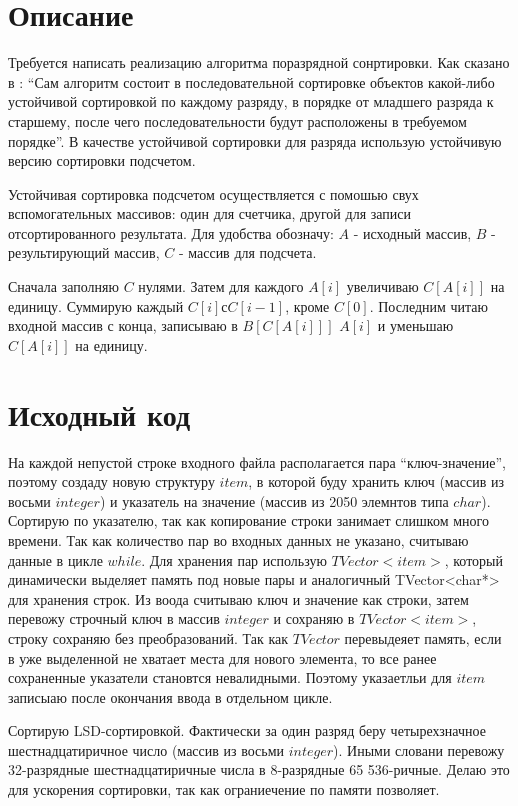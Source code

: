 \section{Описание}
Требуется написать реализацию алгоритма поразрядной сонртировки. 
Как сказано в \cite{Kormen}: \enquote{Сам алгоритм состоит в последовательной сортировке объектов какой-либо устойчивой сортировкой по каждому разряду, в порядке от младшего разряда к старшему, после чего последовательности будут расположены в требуемом порядке}. В качестве устойчивой сортировки для разряда использую устойчивую версию сортировки подсчетом\cite{wikipedia_sort}. 

Устойчивая сортировка подсчетом осуществляется с помошью свух вспомогательных массивов: один для счетчика, другой для записи отсортированного результата. Для удобства обозначу: $A$ - исходный массив, $B$ - результирующий массив, $C$ - массив для подсчета. 

Сначала заполняю $C$ нулями. Затем для каждого $A[i]$ увеличиваю $C[A[i]]$ на единицу. Суммирую каждый $C[i] с C[i - 1]$, кроме $C[0]$. Последним читаю входной массив с конца, записываю в $B[C[A[i]]]$ $A[i]$ и уменьшаю $C[A[i]]$ на единицу\cite{wikipedia_sort}.

\pagebreak

\section{Исходный код}
На каждой непустой строке входного файла располагается пара \enquote{ключ-значение}, поэтому создаду новую 
структуру $item$, в которой буду хранить ключ (массив из восьми $integer$) и указатель на значение (массив из 2050 элемнтов типа $char$).  Сортирую по указателю, так как копирование строки занимает слишком много времени. Так как количество пар во входных данных не указано, считываю данные в цикле $while$. Для хранения пар использую $TVector<item>$, который динамически выделяет память под новые пары и аналогичный TVector<char*> для хранения строк. Из воода считываю ключ и значение как строки, затем перевожу строчный ключ в массив $integer$ и сохраняю в $TVector<item>$, строку сохраняю без преобразований. Так как $TVector$ перевыдеяет память, если в уже выделенной не хватает места для нового элемента, то все ранее сохраненные указатели становтся невалидными. Поэтому указаетльи для  $item$ записыаю после окончания ввода в отдельном цикле.

Сортирую LSD-сортировкой. Фактически за один разряд беру четырехзначное шестнадцатиричное число (массив из восьми $integer$). Иными словани перевожу 32-разрядные шестнадцатиричные числа в 8-разрядные 65 536-ричные. Делаю это для ускорения сортировки, так как ограниечение по памяти позволяет. 

